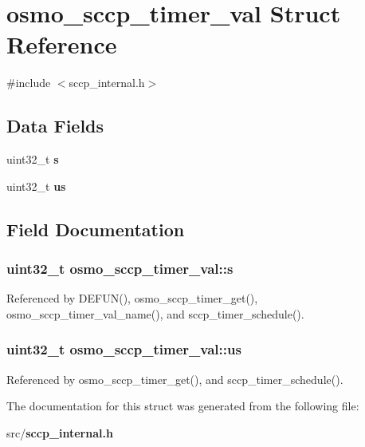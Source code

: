 \section{osmo\+\_\+sccp\+\_\+timer\+\_\+val Struct Reference}
\label{structosmo__sccp__timer__val}


{\ttfamily \#include $<$sccp\+\_\+internal.\+h$>$}

\subsection*{Data Fields}
\begin{DoxyCompactItemize}
\item 
uint32\+\_\+t {\bf s}
\item 
uint32\+\_\+t {\bf us}
\end{DoxyCompactItemize}


\subsection{Field Documentation}
\subsubsection[{s}]{\setlength{\rightskip}{0pt plus 5cm}uint32\+\_\+t osmo\+\_\+sccp\+\_\+timer\+\_\+val\+::s}\label{structosmo__sccp__timer__val_ae9a5feee07108a506b16a7b3c730152c}


Referenced by D\+E\+F\+U\+N(), osmo\+\_\+sccp\+\_\+timer\+\_\+get(), osmo\+\_\+sccp\+\_\+timer\+\_\+val\+\_\+name(), and sccp\+\_\+timer\+\_\+schedule().

\subsubsection[{us}]{\setlength{\rightskip}{0pt plus 5cm}uint32\+\_\+t osmo\+\_\+sccp\+\_\+timer\+\_\+val\+::us}\label{structosmo__sccp__timer__val_a9c3e9aef9f871ecf35bd44d1c8755075}


Referenced by osmo\+\_\+sccp\+\_\+timer\+\_\+get(), and sccp\+\_\+timer\+\_\+schedule().



The documentation for this struct was generated from the following file\+:\begin{DoxyCompactItemize}
\item 
src/{\bf sccp\+\_\+internal.\+h}\end{DoxyCompactItemize}
